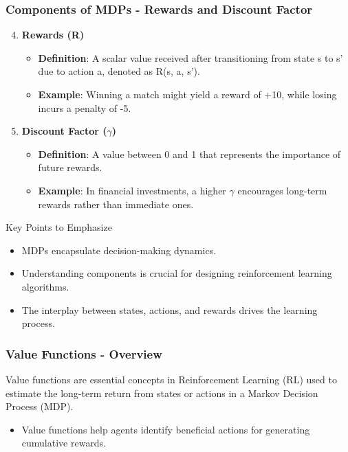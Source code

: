 \documentclass[aspectratio=169]{beamer}
\begin{document}
\begin{frame}[fragile]
  \frametitle{Components of MDPs - Rewards and Discount Factor}
  \begin{enumerate}
    \setcounter{enumi}{3} %
    \item \textbf{Rewards (R)}
      \begin{itemize}
        \item \textbf{Definition}: A scalar value received after transitioning from state s to s' due to action a, denoted as R(s, a, s').
        \item \textbf{Example}: Winning a match might yield a reward of +10, while losing incurs a penalty of -5.
      \end{itemize}

    \item \textbf{Discount Factor ($\gamma$)}
      \begin{itemize}
        \item \textbf{Definition}: A value between 0 and 1 that represents the importance of future rewards.
        \item \textbf{Example}: In financial investments, a higher $\gamma$ encourages long-term rewards rather than immediate ones.
      \end{itemize}
  \end{enumerate}
  
  \begin{block}{Key Points to Emphasize}
    \begin{itemize}
      \item MDPs encapsulate decision-making dynamics.
      \item Understanding components is crucial for designing reinforcement learning algorithms.
      \item The interplay between states, actions, and rewards drives the learning process.
    \end{itemize}
  \end{block}
\end{frame}

\begin{frame}[fragile]
    \frametitle{Value Functions - Overview}
    
    Value functions are essential concepts in Reinforcement Learning (RL) used to estimate the long-term return from states or actions in a Markov Decision Process (MDP).
    
    \begin{itemize}
        \item Value functions help agents identify beneficial actions for generating cumulative rewards.
    \end{itemize}

\end{frame}
\end{document}
